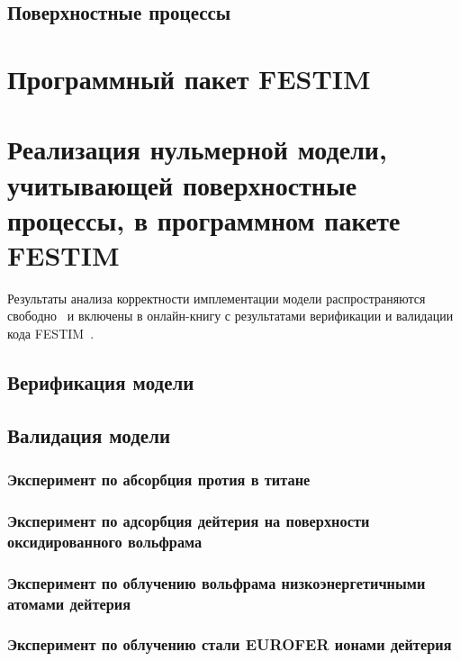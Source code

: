 \subsection{Поверхностные процессы}\label{sec:ch2/sec1/subsec2}

\section{Программный пакет FESTIM}\label{sec:ch2/sec2}

\section{Реализация нульмерной модели, учитывающей поверхностные процессы, в программном пакете FESTIM}\label{sec:ch2/sec3}
Результаты анализа корректности имплементации модели распространяются свободно~\cite{vladimir_kulagin_2025_14738004} и включены в онлайн-книгу с результатами верификации и валидации кода FESTIM~\cite{FESTIM_VV}.

\subsection{Верификация модели}\label{sec:ch2/sec3/subsec1}
\subsection{Валидация модели}\label{sec:ch2/sec3/subsec2}
\subsubsection{Эксперимент по абсорбция протия в титане}\label{sec:ch2/sec3/subsec2/subsubsec1}
\subsubsection{Эксперимент по адсорбция дейтерия на поверхности оксидированного вольфрама}\label{sec:ch2/sec3/subsec2/subsubsec2}
\subsubsection{Эксперимент по облучению вольфрама низкоэнергетичными атомами дейтерия}\label{sec:ch2/sec2/subsec3/subsubsec3}
\subsubsection{Эксперимент по облучению стали EUROFER ионами дейтерия}\label{sec:ch2/sec2/subsec/subsubsec4}

\section{}

\FloatBarrier
